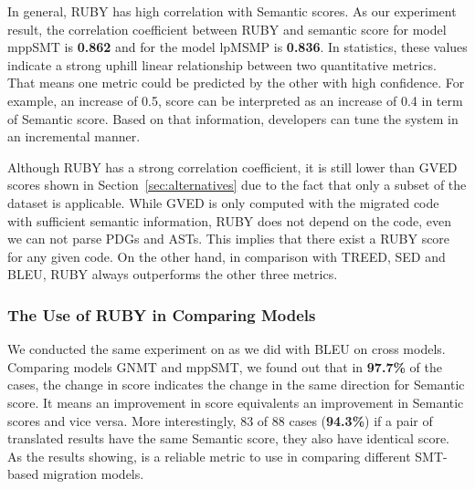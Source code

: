 In general, RUBY has high correlation with Semantic scores. As our
experiment result, the correlation coefficient between RUBY and
semantic score for model mppSMT is \textbf{0.862} and for the model
lpMSMP is \textbf{0.836}. In statistics, these values indicate a
strong uphill linear relationship between two quantitative
metrics. That means one metric could be predicted by the other with
high confidence. For example, an increase of 0.5, {\model} score can
be interpreted as an increase of 0.4 in term of Semantic score. Based
on that information, developers can tune the system in an incremental
manner.

Although RUBY has a strong correlation coefficient, it is still lower
than GVED scores shown in Section~\ref{sec:alternatives} due to the
fact that only a subset of the dataset is applicable. While GVED is
only computed with the migrated code with sufficient semantic
information, RUBY does not depend on the code, even we can not parse
PDGs and ASTs. This implies that there exist a RUBY score for any
given code. On the other hand, in comparison with TREED, SED
and BLEU, RUBY always outperforms the other three metrics.

	    
\subsubsection{The Use of RUBY in Comparing Models}
We conducted the same experiment on {\model} as we did with BLEU on cross models. 
Comparing models GNMT and mppSMT, we found out that in \textbf{97.7\%} of the cases, the change in {\model} score indicates the change in the same direction for Semantic score. It means an improvement in {\model} score equivalents an improvement in Semantic scores and vice versa. More interestingly, 83 of 88 cases (\textbf{94.3\%}) if a pair of translated results have the same Semantic score, they also have identical {\model} score. 
As the results showing, {\model} is a reliable metric to use in comparing different SMT-based migration models. 	
